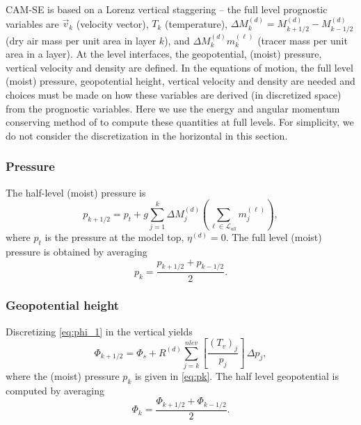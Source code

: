 \documentclass{agujournal}
\begin{document}
{CAM-SE is based on a Lorenz vertical staggering -- the full level prognostic variables are $\vec{v}_k$ (velocity vector), $T_k$ (temperature), $\Delta M^{(d)}_k=M^{(d)}_{k+1/2}-M^{(d)}_{k-1/2}$ (dry air mass per unit area in layer $k$), and $\Delta M^{(d)}_k m_k^{(\ell)}$ (tracer mass per unit area in a layer). At the level interfaces, the geopotential, (moist) pressure, vertical velocity and density are defined. In the equations of motion, the full level (moist) pressure, geopotential height, vertical velocity and density are needed and choices must be made on how these variables are derived (in discretized space) from the prognostic variables. Here we use the energy and angular momentum conserving method of \citet{SB1981MWR} to compute these quantities at full levels. For simplicity, we do not consider the discretization in the horizontal in this section.
\subsubsection{Pressure}\label{sec:pk}
The half-level (moist) pressure is
\begin{equation}
p_{k+1/2}=p_t+g\sum_{j=1}^{k}\Delta M^{(d)}_j \left(\sum_{\ell \in \mathcal{L}_{all}} m_j^{(\ell)}\right),\label{eq:halfpfull}
\end{equation}
where $p_t$ is the pressure at the model top, $\eta^{(d)}=0$.
The full level (moist) pressure is obtained by averaging \citep{SB1981MWR}
\begin{equation}
p_k=\frac{p_{k+1/2}+p_{k-1/2}}{2}.\label{eq:pk}
\end{equation}
\subsubsection{Geopotential height}
Discretizing \eqref{eq:phi_1} in the vertical yields
\begin{equation}
\Phi_{k+1/2}=\Phi_s+R^{(d)}\sum_{j=k}^{nlev} \left[ \frac{(T_v)_j}{p_j}\right]\, \Delta p_j,
\end{equation}
where the (moist) pressure $p_k$ is given in \eqref{eq:pk}. The half level geopotential is computed by averaging
\begin{equation}
\Phi_k=\frac{\Phi_{k+1/2}+\Phi_{k-1/2}}{2}.
\end{equation}
}
\end{document}
